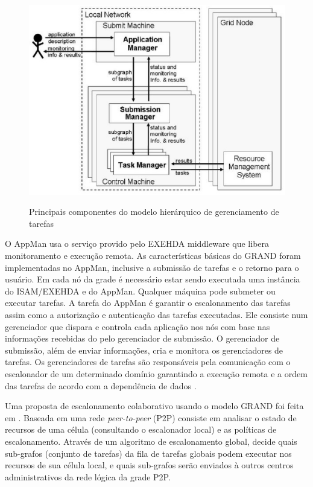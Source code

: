 \begin{figure}[h]
\center
\includegraphics[scale=.6]{img/grand.eps}
\label{grand}
\caption{Principais componentes do modelo hierárquico de gerenciamento de tarefas}
\end{figure}

O AppMan usa o serviço provido pelo EXEHDA middleware \cite{Nino2006} que libera monitoramento e execução remota. As características básicas do GRAND foram implementadas no AppMan, inclusive a submissão de tarefas e o retorno para o usuário. Em cada nó da grade é necessário estar sendo executada uma instância do ISAM/EXEHDA e do AppMan. Qualquer máquina pode submeter ou executar tarefas. A tarefa do AppMan é garantir o escalonamento das tarefas assim como a autorização e autenticação das tarefas executadas. Ele consiste num gerenciador que dispara e controla cada aplicação nos nós com base nas informações recebidas do pelo gerenciador de submissão. O gerenciador de submissão, além de enviar informações, cria e monitora os gerenciadores de tarefas. Os gerenciadores de tarefas são responsáveis pela comunicação com o escalonador de um determinado domínio garantindo a execução remota e a ordem das tarefas de acordo com a dependência de dados \cite{Mangan2006}.

Uma proposta de escalonamento colaborativo usando o modelo GRAND foi feita em \cite{Santos}. Baseada em uma rede \emph{peer-to-peer} (P2P) consiste em analisar o estado de recursos de uma célula (consultando o escalonador local) e as políticas de escalonamento. Através de um algoritmo de escalonamento global, decide quais sub-grafos (conjunto de tarefas) da fila de tarefas globais podem executar nos recursos de sua célula local, e quais sub-grafos serão enviados à outros centros administrativos da rede lógica da grade P2P.

